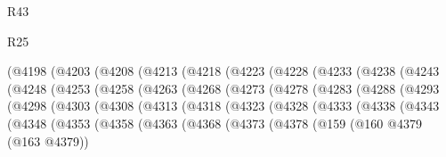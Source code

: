 \begin{lexlean}{R43}
\begin{lexlean}{R25}
\begin{coremodule}
{{{{{{{{{{{{{{{{{{{{{{{{{{{{{{{{{{{{{{{{{{{{{{{{{{{{{{{{{{{{{{{{{{{{{{{{{{{{{{{{{{{{{{{{{{{{{{{{{{{{{{{{{{{{{{{{{{{{{{{{{{{{{{{{{{{{{{{{{{{{{{{{{{{{{{{{{{{{{{{{{{{{{{{{{{{{{{{{{{{{{{{{{{{{{{{{{                (@4198
                  (@4203
                    (@4208
                      (@4213
                        (@4218
                          (@4223
                            (@4228
                              (@4233
                                (@4238
                                  (@4243
                                    (@4248
                                      (@4253
                                        (@4258
                                          (@4263
                                            (@4268
                                              (@4273
                                                (@4278
                                                  (@4283
                                                    (@4288
                                                      (@4293
                                                        (@4298
                                                          (@4303
                                                            (@4308
                                                              (@4313
                                                                (@4318
                                                                  (@4323
                                                                    (@4328
                                                                      (@4333
                                                                        (@4338
                                                                          (@4343
                                                                            (@4348
                                                                              (@4353
                                                                                (@4358
                                                                                  (@4363
                                                                                    (@4368
                                                                                      (@4373
                                                                                        (@4378
                                                                                          (@159
                                                                                            (@160
                                                                                              @4379
                                                                                              (@163
                                                                                                @4379))
}}}}}}}}}}}}}}}}}}}}}}}}}}}}}}}}}}}}}}}}}}}}}}}}}}}}}}}}}}}}}}}}}}}}}}}}}}}}}}}}}}}}}}}}}}}}}}}}}}}}}}}}}}}}}}}}}}}}}}}}}}}}}}}}}}}}}}}}}}}}}}}}}}}}}}}}}}}}}}}}}}}}}}}}}}}}}}}}}}}}}}}}}}}}}}}}}
\end{coremodule}
\end{lexlean}
\end{lexlean}
